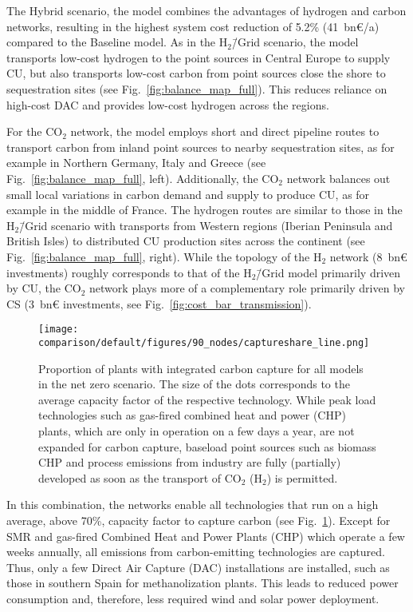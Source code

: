 \documentclass[twocolumn]{article}
\newcommand{\COtwo}{CO$_2$}
\newcommand{\Htwo}{H$_2$}
\newcommand{\modBase}{Baseline model}
\newcommand{\modH}{H$_2$\=/Grid model}
\newcommand{\carbon}{CO$_2$}
\newcommand{\hydrogenscenario}{H$_2$\=/Grid scenario}
\newcommand{\hybridscenario}{Hybrid scenario}
\begin{document}
The \hybridscenario{}, the model combines the advantages of hydrogen and carbon networks, resulting in the highest system cost reduction of \label{}5.2\% (\label{}41~bn€/a) compared to the \modBase{}. As in the \hydrogenscenario{}, the model transports low-cost hydrogen to the point sources in Central Europe to supply CU, but also transports low-cost carbon from point sources close the shore to sequestration sites (see Fig.~\ref{fig:balance_map_full}). This reduces reliance on high-cost DAC and provides low-cost hydrogen across the regions.


For the \carbon{} network, the model employs short and direct pipeline routes to transport carbon from inland point sources to nearby sequestration sites, as for example in Northern Germany, Italy and Greece (see Fig.~\ref{fig:balance_map_full}, left). Additionally, the \COtwo{} network balances out small local variations in carbon demand and supply to produce CU, as for example in the middle of France.
The hydrogen routes are similar to those in the \hydrogenscenario{} with transports from Western regions (Iberian Peninsula and British Isles) to distributed CU production sites across the continent (see Fig.~\ref{fig:balance_map_full}, right).
While the topology of the \Htwo{} network (8~bn€ investments) roughly corresponds to that of the \modH{} primarily driven by CU, the \COtwo{} network plays more of a complementary role primarily driven by CS (3~bn€ investments, see Fig.~\ref{fig:cost_bar_transmission}).


\begin{figure}[ht]
    \centering
    \texttt{[image: comparison/default/figures/90\_nodes/captureshare\_line.png]}
    \caption{Proportion of plants with integrated carbon capture for all models in the net zero scenario. The size of the dots corresponds to the average capacity factor of the respective technology. While peak load technologies such as gas-fired combined heat and power (CHP) plants, which are only in operation on a few days a year, are not expanded for carbon capture, baseload point sources such as biomass CHP and process emissions from industry are fully (partially) developed as soon as the transport of \COtwo{} (\Htwo{}) is permitted.}
    \label{fig:captureshare_line}
\end{figure}%


In this combination, the networks enable all technologies that run on a high average, above 70\%, capacity factor to capture carbon (see Fig.~\ref{fig:captureshare_line}). Except for SMR and gas-fired Combined Heat and Power Plants (CHP) which operate a few weeks annually, all emissions from carbon-emitting technologies are captured.
Thus, only a few Direct Air Capture (DAC) installations are installed, such as those in southern Spain for methanolization plants. This leads to reduced power consumption and, therefore, less required wind and solar power deployment.
\end{document}
